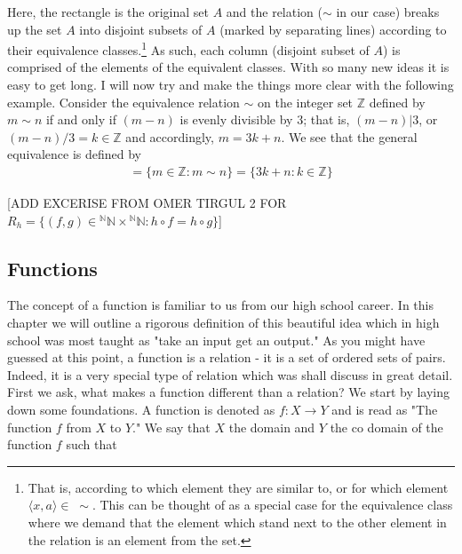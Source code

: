 \documentclass{tufte-handout} %
\theoremstyle{definition}
\theoremstyle{remark}
\newcommand{\N}{\mathbb{N}}
\newcommand{\Z}{\mathbb{Z}}
\begin{document}
Here, the rectangle is the original set $A$ and the relation ($\sim$ in our case) breaks up the set $A$ into disjoint subsets of $A$ (marked by separating lines) according to their equivalence classes.\footnote{That is, according to which element they are similar to, or for which element $\langle x,a \rangle \in \; \sim$. This can be thought of as a special case for the equivalence class where we demand that the element which stand next to the other element in the relation is an element from the set.} As such, each column (disjoint subset of $A$) is comprised of the elements of the equivalent classes. With so many new ideas it is easy to get long. I will now try and make the things more clear with the following example. Consider the equivalence relation $\sim$ on the integer set $\mathbb{Z}$ defined by $m\sim n$ if and only if $(m-n)$ is evenly divisible by $3$; that is, $(m-n) | 3$, or $(m-n)/3=k\in\Z$ and accordingly, $m=3k+n$. We see that the general equivalence is defined by 
\begin{align}
    [n] = \{m\in \mathbb{Z}: m\sim n\} = \{3k+n: k\in \Z\}
\end{align}

[ADD EXCERISE FROM OMER TIRGUL 2 FOR $R_{h}=\{(f,g)\in {{^{\N}}\N} \times {{^{\N}}\N }: h \circ f = h \circ g\}$]
\subsection{Functions}
The concept of a function is familiar to us from our high school career. In this chapter we will outline a rigorous definition of this beautiful idea which in high school was most taught as "take an input get an output." As you might have guessed at this point, a function is a relation - it is a set of ordered sets of pairs. Indeed, it is a very special type of relation which was shall discuss in great detail. First we ask, what makes a function different than a relation? We start by laying down some foundations. A function is denoted as $f: X \to Y$ and is read as "The function $f$ from $X$ to $Y$." We say that $X$ the domain and $Y$ the co domain of the function $f$ such that 
\end{document}
